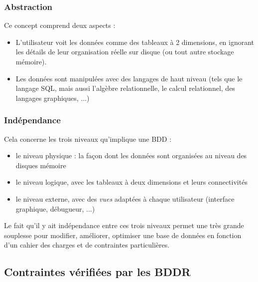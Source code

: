 \documentclass[11pt,a4paper,french,twoside]{PMCours}
\begin{document}
\subsubsection{Abstraction}

Ce concept comprend deux aspects :
\begin{itemize}
 \item L'utilisateur voit les données comme des tableaux à 2 dimensions, en ignorant les détails de leur organisation réelle sur disque (ou tout autre stockage mémoire).
 \item Les données sont manipulées avec des langages de haut niveau (tels que le langage SQL, mais aussi l'algèbre relationnelle, le calcul relationnel, des langages graphiques, ...)
\end{itemize}


\subsubsection{Indépendance}

Cela concerne les trois niveaux qu'implique une BDD : 
\begin{itemize}
 \item le niveau physique : la façon dont les données sont organisées au niveau des disques mémoire
 \item le niveau logique, avec les tableaux à deux dimensions et leurs connectivités
 \item le niveau externe, avec des \emph{vues} adaptées à chaque utilisateur (interface graphique, débugueur, ...)
\end{itemize}
Le fait qu'il y ait indépendance entre ces trois niveaux permet une très grande souplesse pour modifier, améliorer, optimiser une base de données en fonction d'un cahier des charges et de contraintes particulières.

\subsection{Contraintes vérifiées par les BDDR}
\end{document}
